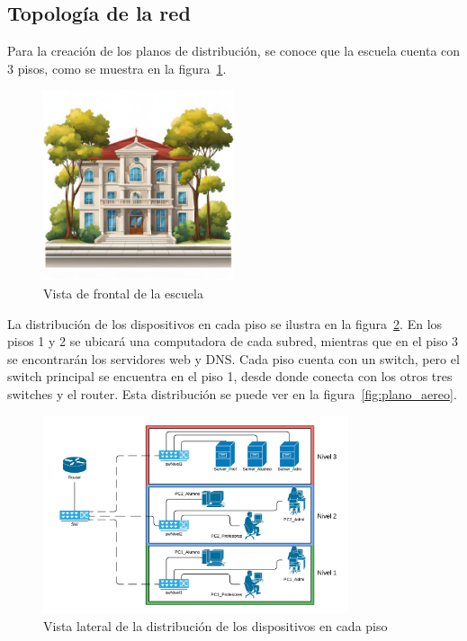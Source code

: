     \subsection{Topología de la red}

    Para la creación de los planos de distribución, se conoce que la escuela cuenta con 3 pisos, como se muestra en la figura~\ref{fig:plano_frontal}.

    \begin{figure}[H]
        \centering
        \includegraphics[width=0.5\textwidth]{img/escuela.png}
        \caption{Vista de frontal de la escuela}
        \label{fig:plano_frontal}
    \end{figure}

    La distribución de los dispositivos en cada piso se ilustra en la figura~\ref{fig:plano_lat}. En los pisos 1 y 2 se ubicará una computadora de cada subred, mientras que en el piso 3 se encontrarán los servidores web y DNS. Cada piso cuenta con un switch, pero el switch principal se encuentra en el piso 1, desde donde conecta con los otros tres switches y el router. Esta distribución se puede ver en la figura~\ref{fig:plano_aereo}.

    \begin{figure}[H]
        \centering
        \includegraphics[width=0.8\textwidth]{img/topologia.png}
        \caption{Vista lateral de la distribución de los dispositivos en cada piso}
        \label{fig:plano_lat}
    \end{figure}

